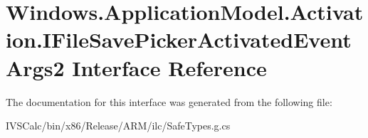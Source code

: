 \hypertarget{interface_windows_1_1_application_model_1_1_activation_1_1_i_file_save_picker_activated_event_args2}{}\section{Windows.\+Application\+Model.\+Activation.\+I\+File\+Save\+Picker\+Activated\+Event\+Args2 Interface Reference}
\label{interface_windows_1_1_application_model_1_1_activation_1_1_i_file_save_picker_activated_event_args2}


The documentation for this interface was generated from the following file\+:\begin{DoxyCompactItemize}
\item 
I\+V\+S\+Calc/bin/x86/\+Release/\+A\+R\+M/ilc/Safe\+Types.\+g.\+cs\end{DoxyCompactItemize}
